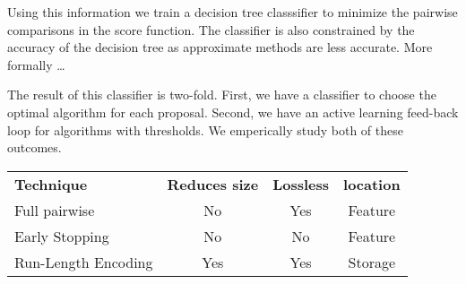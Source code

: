 Using this information we train a decision tree classsifier to minimize the 
pairwise comparisons in the score function.
The classifier is also constrained by the accuracy of the decision tree as 
approximate methods are less accurate.
More formally \ldots

The result of this classifier is two-fold.
First, we have a classifier to choose the optimal algorithm for each proposal.
Second, we have an active learning feed-back loop for algorithms with 
thresholds.
We emperically study both of these outcomes.

\begin{tabular}{l c c c}
\textbf{Technique} & \textbf{Reduces size} & \textbf{Lossless} & \textbf{location} \\
Full pairwise & No & Yes & Feature\\
Early Stopping~\cite{singh2012monte} & No & No & Feature\\
Run-Length Encoding & Yes & Yes & Storage\\
\end{tabular}





